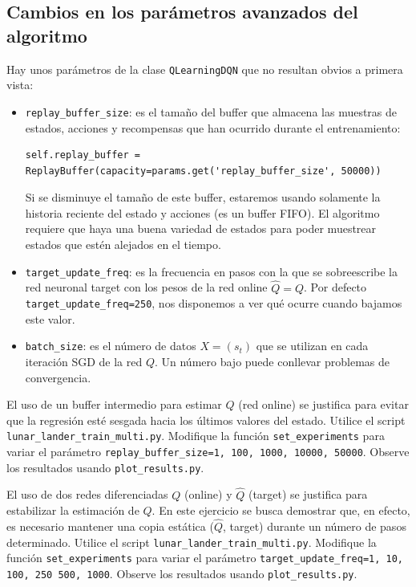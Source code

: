 \documentclass{article}
\begin{document}

\subsection{Cambios en los parámetros avanzados del algoritmo}

Hay unos parámetros de la clase \texttt{QLearningDQN} que no resultan obvios a primera vista:
\begin{itemize}
    \item \texttt{replay\_buffer\_size}: es el tamaño del buffer que almacena las muestras de estados, acciones y recompensas que han ocurrido durante el entrenamiento:
\begin{verbatim}
self.replay_buffer = ReplayBuffer(capacity=params.get('replay_buffer_size', 50000))
\end{verbatim}
    Si se disminuye el tamaño de este buffer, estaremos usando solamente la historia reciente del estado y acciones (es un buffer FIFO). El algoritmo requiere que haya una buena variedad de estados para poder muestrear estados que estén alejados en el tiempo.
    
    \item \texttt{target\_update\_freq}: es la frecuencia en pasos con la que se sobreescribe la red neuronal target con los pesos de la red online $\hat{Q}=Q$. Por defecto \texttt{target\_update\_freq=250}, nos disponemos a ver qué ocurre cuando bajamos este valor.
    \item \texttt{batch\_size}: es el número de datos $X=(s_t)$ que se utilizan en cada iteración SGD de la red $Q$. Un número bajo puede conllevar problemas de convergencia.
\end{itemize}

\begin{exercise}
El uso de un buffer intermedio para estimar $Q$ (red online) se justifica para evitar que la regresión esté sesgada hacia los últimos valores del estado. Utilice el script \texttt{lunar\_lander\_train\_multi.py}. Modifique la función \texttt{set\_experiments} para variar el parámetro \texttt{replay\_buffer\_size=1, 100, 1000, 10000, 50000}. Observe los resultados usando \texttt{plot\_results.py}.
\end{exercise}

\begin{exercise}
El uso de dos redes diferenciadas $Q$ (online) y $\hat{Q}$ (target) se justifica para estabilizar la estimación de $Q$. En este ejercicio se busca demostrar que, en efecto, es necesario mantener una copia estática ($\hat{Q}$, target) durante un número de pasos determinado. Utilice el script \texttt{lunar\_lander\_train\_multi.py}. Modifique la función \texttt{set\_experiments} para variar el parámetro \texttt{target\_update\_freq=1, 10, 100, 250 500, 1000}. Observe los resultados usando \texttt{plot\_results.py}.
\end{exercise}
\end{document}
